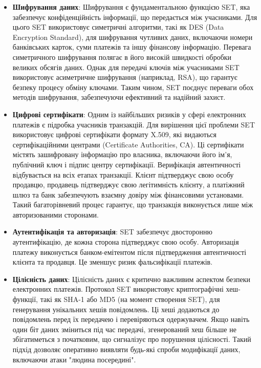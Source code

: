 \begin{itemize}
    \item \textbf{Шифрування даних}: Шифрування є фундаментальною функцією SET, яка забезпечує конфіденційність інформації, що передається між учасниками. Для цього SET використовує симетричні алгоритми, такі як DES (Data Encryption Standard), для шифрування чутливих даних, включаючи номери банківських карток, суми платежів та іншу фінансову інформацію. Перевага симетричного шифрування полягає в його високій швидкості обробки великих обсягів даних. Однак для передачі ключів між учасниками SET використовує асиметричне шифрування (наприклад, RSA), що гарантує безпеку процесу обміну ключами. Таким чином, SET поєднує переваги обох методів шифрування, забезпечуючи ефективний та надійний захист.

    \item \textbf{Цифрові сертифікати}: Одним із найбільших ризиків у сфері електронних платежів є підробка учасників транзакцій. Для вирішення цієї проблеми SET використовує цифрові сертифікати формату X.509, які видаються сертифікаційними центрами (Certificate Authorities, CA). Ці сертифікати містять зашифровану інформацію про власника, включаючи його ім'я, публічний ключ і підпис центру сертифікації. Верифікація автентичності відбувається на всіх етапах транзакції. Клієнт підтверджує свою особу продавцю, продавець підтверджує свою легітимність клієнту, а платіжний шлюз та банк забезпечують взаємну довіру між фінансовими установами. Такий багаторівневий процес гарантує, що транзакція виконується лише між авторизованими сторонами.

    \item \textbf{Аутентифікація та авторизація}: SET забезпечує двосторонню аутентифікацію, де кожна сторона підтверджує свою особу. Авторизація платежу виконується банком-емітентом після підтвердження автентичності клієнта та продавця. Це зменшує ризик фальсифікації платежів.

    \item \textbf{Цілісність даних}: Цілісність даних є критично важливим аспектом безпеки електронних платежів. Протокол SET використовує криптографічні хеш-функції, такі як SHA-1 або MD5 (на момент створення SET), для генерування унікальних хешів повідомлень. Ці хеші додаються до повідомлень перед їх передачею і перевіряються одержувачем. Якщо навіть один біт даних зміниться під час передачі, згенерований хеш більше не збігатиметься з початковим, що сигналізує про порушення цілісності. Такий підхід дозволяє оперативно виявляти будь-які спроби модифікації даних, включаючи атаки "людина посередині".
\end{itemize}


